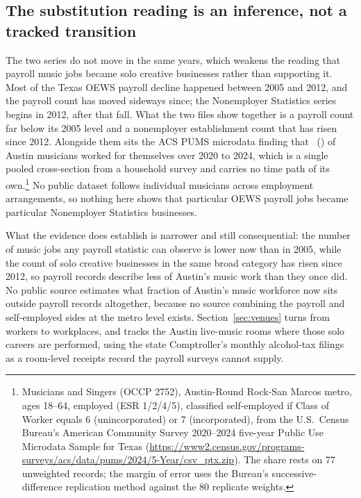 \subsection{The substitution reading is an inference, not a tracked transition}

The two series do not move in the same years, which weakens the reading
that payroll music jobs became solo creative businesses rather than
supporting it. Most of the Texas OEWS payroll decline happened between 2005
and 2012, and the payroll count has moved sideways since; the Nonemployer
Statistics series begins in 2012, after that fall. What the two files show
together is a payroll count far below its 2005 level and a nonemployer
establishment count that has risen since 2012. Alongside them sits the ACS
PUMS microdata finding that \NPumsAustinMusSelfemp\
(\NPumsAustinMusSelfempMoe) of Austin musicians worked for themselves over
2020 to 2024, which is a single pooled cross-section from a household
survey and carries no time path of its own.\footnote{Musicians and Singers
(OCCP 2752), Austin-Round Rock-San Marcos metro, ages 18--64, employed
(ESR 1/2/4/5), classified self-employed if Class of Worker equals 6
(unincorporated) or 7 (incorporated), from the U.S.\ Census Bureau's
American Community Survey 2020--2024 five-year Public Use Microdata
Sample for Texas
(\url{https://www2.census.gov/programs-surveys/acs/data/pums/2024/5-Year/csv_ptx.zip}).
The share rests on 77 unweighted records; the margin of error uses the
Bureau's successive-difference replication method against the 80
replicate weights.} No public dataset follows individual musicians across
employment arrangements, so nothing here shows that particular OEWS
payroll jobs became particular Nonemployer Statistics businesses.

What the evidence does establish is narrower and still consequential: the
number of music jobs any payroll statistic can observe is lower now than in
2005, while the count of solo creative businesses in the same broad
category has risen since 2012, so payroll records describe less of Austin's
music work than they once did. No public source estimates what fraction of
Austin's music workforce now sits outside payroll records altogether,
because no source combining the payroll and self-employed sides at the
metro level exists. Section~\ref{sec:venues} turns from workers to
workplaces, and tracks the Austin live-music rooms where those solo careers
are performed, using the state Comptroller's monthly alcohol-tax filings as
a room-level receipts record the payroll surveys cannot supply.
